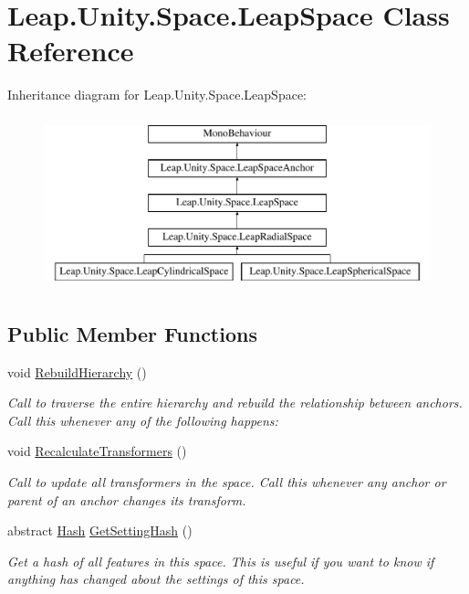 \hypertarget{class_leap_1_1_unity_1_1_space_1_1_leap_space}{}\section{Leap.\+Unity.\+Space.\+Leap\+Space Class Reference}
\label{class_leap_1_1_unity_1_1_space_1_1_leap_space}
Inheritance diagram for Leap.\+Unity.\+Space.\+Leap\+Space\+:\begin{figure}[H]
\begin{center}
\leavevmode
\includegraphics[height=5.000000cm]{class_leap_1_1_unity_1_1_space_1_1_leap_space}
\end{center}
\end{figure}
\subsection*{Public Member Functions}
\begin{DoxyCompactItemize}
\item 
void \mbox{\hyperlink{class_leap_1_1_unity_1_1_space_1_1_leap_space_ae41c6fa919d7fe3f52cb1917e8874cd3}{Rebuild\+Hierarchy}} ()
\begin{DoxyCompactList}\small\item\em Call to traverse the entire hierarchy and rebuild the relationship between anchors. Call this whenever any of the following happens\+: \end{DoxyCompactList}\item 
void \mbox{\hyperlink{class_leap_1_1_unity_1_1_space_1_1_leap_space_ad576147f05921e27d31504aca66a4e06}{Recalculate\+Transformers}} ()
\begin{DoxyCompactList}\small\item\em Call to update all transformers in the space. Call this whenever any anchor or parent of an anchor changes it\textquotesingle{}s transform. \end{DoxyCompactList}\item 
abstract \mbox{\hyperlink{struct_leap_1_1_unity_1_1_hash}{Hash}} \mbox{\hyperlink{class_leap_1_1_unity_1_1_space_1_1_leap_space_a42752b3c5be3fadbca02e0060a8cc7ea}{Get\+Setting\+Hash}} ()
\begin{DoxyCompactList}\small\item\em Get a hash of all features in this space. This is useful if you want to know if anything has changed about the settings of this space. \end{DoxyCompactList}\end{DoxyCompactItemize}
